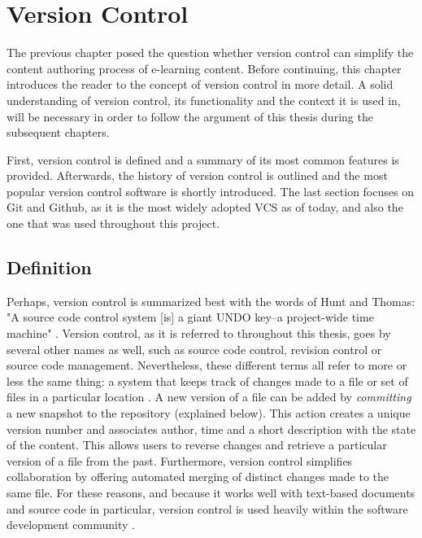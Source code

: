 \chapter{Version Control} \label{chapter:version-control}
The previous chapter posed the question whether version control can simplify the content authoring process of e-learning content. Before continuing, this chapter introduces the reader to the concept of version control in more detail. A solid understanding of version control, its functionality and the context it is used in, will be necessary in order to follow the argument of this thesis during the subsequent chapters.

First, version control is defined and a summary of its most common features is provided. Afterwards, the history of version control is outlined and the most popular version control software is shortly introduced. The last section focuses on Git and Github, as it is the most widely adopted VCS as of today, and also the one that was used throughout this project.

\section{Definition}
Perhaps, version control is summarized best with the words of Hunt and Thomas: "A source code control system [is] a giant UNDO key–a project-wide time machine" \cite{hunt_pragmatic_1999}. Version control, as it is referred to throughout this thesis, goes by several other names as well, such as source code control, revision control or source code management. Nevertheless, these different terms all refer to more or less the same thing: a system that keeps track of changes made to a file or set of files in a particular location \cite{ruparelia_history_2010}. A new version of a file can be added by \textit{committing} a new snapshot to the repository (explained below). This action creates a unique version number and associates author, time and a short description with the state of the content. This allows users to reverse changes and retrieve a particular version of a file from the past. Furthermore, version control simplifies collaboration by offering automated merging of distinct changes made to the same file. For these reasons, and because it works well with text-based documents and source code in particular, version control is used heavily within the software development community \cite{_stack_2015}.

